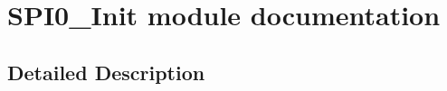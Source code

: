 \hypertarget{group___s_p_i0___init__module}{}\section{S\+P\+I0\+\_\+\+Init module documentation}
\label{group___s_p_i0___init__module}


\subsection{Detailed Description}
